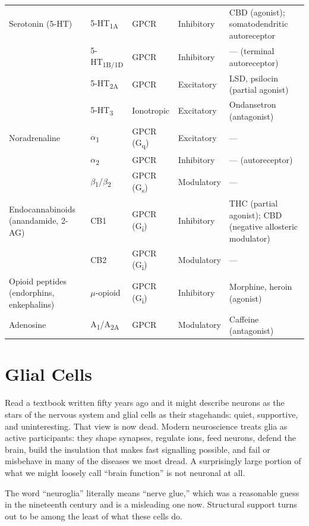 \documentclass[11pt]{article}
\begin{document}
{\begin{longtable}{p{2.9cm} p{2.4cm} p{1.8cm} p{1.9cm} p{4.0cm}}
Serotonin (5-HT) & 5-HT\textsubscript{1A} & GPCR & Inhibitory & CBD (agonist); somatodendritic autoreceptor \\
 & 5-HT\textsubscript{1B/1D} & GPCR & Inhibitory & --- (terminal autoreceptor) \\
 & 5-HT\textsubscript{2A} & GPCR & Excitatory & LSD, psilocin (partial agonist) \\
 & 5-HT\textsubscript{3} & Ionotropic & Excitatory & Ondansetron (antagonist) \\
\midrule
Noradrenaline & $\alpha$\textsubscript{1} & GPCR (G\textsubscript{q}) & Excitatory & --- \\
 & $\alpha$\textsubscript{2} & GPCR & Inhibitory & --- (autoreceptor) \\
 & $\beta$\textsubscript{1}/$\beta$\textsubscript{2} & GPCR (G\textsubscript{s}) & Modulatory & --- \\
\midrule
Endocannabinoids (anandamide, 2-AG) & CB1 & GPCR (G\textsubscript{i}) & Inhibitory & THC (partial agonist); CBD (negative allosteric modulator) \\
 & CB2 & GPCR (G\textsubscript{i}) & Modulatory & --- \\
\midrule
Opioid peptides (endorphins, enkephalins) & $\mu$-opioid & GPCR (G\textsubscript{i}) & Inhibitory & Morphine, heroin (agonist) \\
\midrule
Adenosine & A\textsubscript{1}/A\textsubscript{2A} & GPCR & Modulatory & Caffeine (antagonist) \\
\end{longtable}
}


\section{Glial Cells}

Read a textbook written fifty years ago and it might describe neurons as the stars of the nervous system and glial cells as their stagehands: quiet, supportive, and uninteresting. That view is now dead. Modern neuroscience treats glia as active participants: they shape synapses, regulate ions, feed neurons, defend the brain, build the insulation that makes fast signalling possible, and fail or misbehave in many of the diseases we most dread. A surprisingly large portion of what we might loosely call ``brain function'' is not neuronal at all.

The word ``neuroglia'' literally means ``nerve glue,'' which was a reasonable guess in the nineteenth century and is a misleading one now. Structural support turns out to be among the least of what these cells do.
\end{document}
